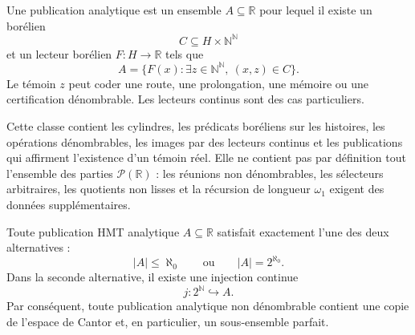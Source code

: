 \begin{definition}
\label{p12-83-c19-s1:hmtch:def-publicacion-analitica}
Une publication analytique est un ensemble \(A\subseteq\mathbb R\) pour lequel
il existe un borélien
\[
 C\subseteq H\times\mathbb N^{\mathbb N}
\]
et un lecteur borélien \(F:H\to\mathbb R\) tels que
\[
 A=\{F(x):\exists z\in\mathbb N^{\mathbb N},\ (x,z)\in C\}.
\]
Le témoin \(z\) peut coder une route, une prolongation, une mémoire ou
une certification dénombrable. Les lecteurs continus sont des cas particuliers.
\end{definition}

Cette classe contient les cylindres, les prédicats boréliens sur les
histoires, les opérations dénombrables, les images par des lecteurs continus
et les publications qui affirment l'existence d'un témoin réel. Elle ne
contient pas par définition tout l'ensemble des parties \(\mathcal P(\mathbb R)\) : les
réunions non dénombrables, les sélecteurs arbitraires, les quotients non lisses et
la récursion de longueur \(\omega_1\) exigent des données supplémentaires.

\begin{theorem}
\label{p12-83-c19-s1:hmtch:thm-dicotomia-perfecta}
Toute publication HMT analytique \(A\subseteq\mathbb R\) satisfait exactement
l'une des deux alternatives :
\[
 |A|\leq\aleph_0
 \qquad\text{ou}\qquad
 |A|=2^{\aleph_0}.
\]
Dans la seconde alternative, il existe une injection continue
\[
 j:2^{\mathbb N}\hookrightarrow A.
\]
Par conséquent, toute publication analytique non dénombrable contient une copie de
l'espace de Cantor et, en particulier, un sous-ensemble parfait.
\end{theorem}


